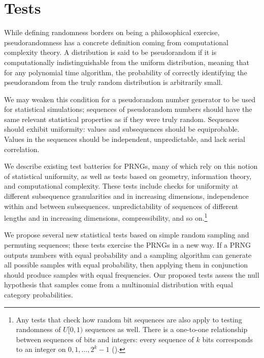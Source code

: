 \documentclass[12pt]{article}
\newcommand{\todo}[1]{{\color{red}{TO DO: \sc #1}}}
\begin{document}
\todo{state space problem: use CSPRNG in counter mode}






\section{Tests}
While defining randomness borders on being a philosophical exercise, pseudorandomness has a concrete definition coming from computational complexity theory.
A distribution is said to be pseudorandom if it is computationally indistinguishable from the uniform distribution,
meaning that for any polynomial time algorithm, the probability of correctly identifying the pseudorandom from the truly random distribution is arbitrarily small.

We may weaken this condition for a pseudorandom number generator to be used for statistical simulations;
sequences of pseudorandom numbers should have the same relevant statistical properties as if they were truly random.
Sequences should exhibit uniformity: values and subsequences should be equiprobable.
Values in the sequences should be independent, unpredictable, and lack serial correlation.

We describe existing test batteries for PRNGs, many of which rely on this notion of statistical uniformity, as well as tests based on geometry, information theory, and computational complexity.
These tests include checks for uniformity at different subsequence granularities and in increasing dimensions,
independence within and between subsequences.
unpredictability of sequences of different lengths and in increasing dimensions,
compressibility, and so on.\footnote{
Any tests that check how random bit sequences are also apply to testing randomness of $U[0,1)$ sequences as well.
There is a one-to-one relationship between sequences of bits and integers:
every sequence of $k$ bits corresponds to an integer on $0, 1, \dots, 2^k-1$ (\cite{lecuyer_testu01_2007}).
}

We propose several new statistical tests based on simple random sampling and permuting sequences;
these tests exercise the PRNGs in a new way.
If a PRNG outputs numbers with equal probability and a sampling algorithm can generate all possible samples with equal probability, then applying them in conjunction should produce samples with equal frequencies.
Our proposed tests assess the null hypothesis that samples come from a multinomial distribution with equal category probabilities.
\end{document}
